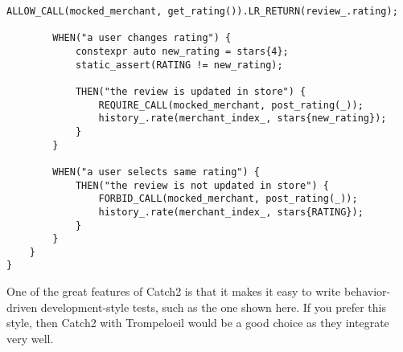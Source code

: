 \begin{lstlisting}[style=styleCXX]
		ALLOW_CALL(mocked_merchant, get_rating()).LR_RETURN(review_.rating);
		
		WHEN("a user changes rating") {
			constexpr auto new_rating = stars{4};
			static_assert(RATING != new_rating);
			
			THEN("the review is updated in store") {
				REQUIRE_CALL(mocked_merchant, post_rating(_));
				history_.rate(merchant_index_, stars{new_rating});
			}
		}
	
		WHEN("a user selects same rating") {
			THEN("the review is not updated in store") {
				FORBID_CALL(mocked_merchant, post_rating(_));
				history_.rate(merchant_index_, stars{RATING});
			}
		}
	}
}
\end{lstlisting}

One of the great features of Catch2 is that it makes it easy to write behavior-driven development-style tests, such as the one shown here. If you prefer this style, then Catch2 with Trompeloeil would be a good choice as they integrate very well.























